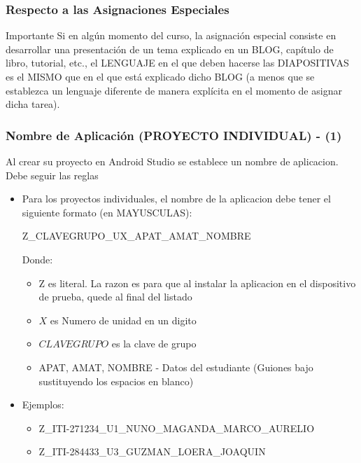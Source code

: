 \begin{frame}
\frametitle{Respecto a las Asignaciones Especiales}

\begin{alertblock}{Importante}
Si en algún momento del curso, la asignación especial consiste en desarrollar una presentación de un tema explicado en un BLOG, capítulo de libro, tutorial, etc., el LENGUAJE en el que deben hacerse las DIAPOSITIVAS es el MISMO que en el que está explicado dicho BLOG (a menos que se establezca un lenguaje diferente de manera explícita en el momento de asignar dicha tarea).
\end{alertblock}



\end{frame}




\begin{frame}
\frametitle{Nombre de Aplicaci\'on (PROYECTO INDIVIDUAL) - (1)}

Al crear su proyecto en Android Studio se establece un nombre de aplicacion. Debe seguir las reglas 
\begin{itemize}

\item Para los proyectos individuales, el nombre de la aplicacion debe tener el siguiente formato (en MAYUSCULAS):

Z\_CLAVEGRUPO\_UX\_APAT\_AMAT\_NOMBRE

Donde:
\begin{itemize}
\item Z es literal. La razon es para que al instalar la aplicacion en el dispositivo de prueba, quede al final del listado
\item $X$ es Numero de unidad en un digito
\item $CLAVEGRUPO$ es la clave de grupo
\item APAT, AMAT, NOMBRE - Datos del estudiante (Guiones bajo sustituyendo los espacios en blanco)
\end{itemize}

\item Ejemplos:
\begin{itemize}
\item Z\_ITI-271234\_U1\_NUNO\_MAGANDA\_MARCO\_AURELIO
\item Z\_ITI-284433\_U3\_GUZMAN\_LOERA\_JOAQUIN
\end{itemize}
\end{itemize}



\end{frame}

